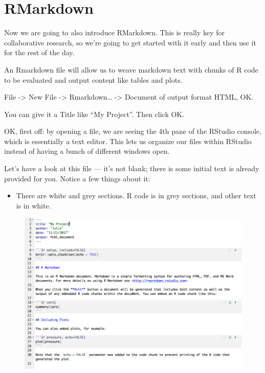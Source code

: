 \documentclass[]{book}
\providecommand{\tightlist}{%
  \setlength{\itemsep}{0pt}\setlength{\parskip}{0pt}}
\theoremstyle{definition}
\theoremstyle{definition}
\theoremstyle{definition}
\theoremstyle{remark}
\begin{document}
\section{RMarkdown}\label{rmarkdown}

Now we are going to also introduce RMarkdown. This is really key for
collaborative research, so we're going to get started with it early and
then use it for the rest of the day.

An Rmarkdown file will allow us to weave markdown text with chunks of R
code to be evaluated and output content like tables and plots.

File -\textgreater{} New File -\textgreater{} Rmarkdown\ldots{}
-\textgreater{} Document of output format HTML, OK.

You can give it a Title like ``My Project''. Then click OK.

OK, first off: by opening a file, we are seeing the 4th pane of the
RStudio console, which is essentially a text editor. This lets us
organize our files within RStudio instead of having a bunch of different
windows open.

Let's have a look at this file --- it's not blank; there is some initial
text is already provided for you. Notice a few things about it:

\begin{itemize}
\tightlist
\item
  There are white and grey sections. R code is in grey sections, and
  other text is in white.
\end{itemize}

\begin{figure}
\centering
\includegraphics{img/rmarkdown.png}
\caption{}
\end{figure}
\end{document}
